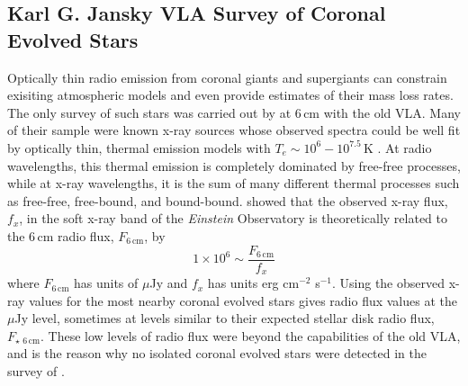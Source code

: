 
\subsection{Karl G. Jansky VLA Survey of Coronal Evolved Stars}\label{sec:8.2.4}
Optically thin radio emission from coronal giants and supergiants can constrain exisiting atmospheric models and even provide estimates of their mass loss rates. The only survey of such stars was carried out by \cite{drake_1986} at 6\,cm with the old VLA. Many of their sample were known x-ray sources whose observed spectra could be well fit by optically thin, thermal emission models with $T_e \sim 10^6-10^{7.5}$\,K \citep{ayres_1981}. At radio wavelengths, this thermal emission is completely dominated by free-free processes, while at x-ray wavelengths, it is the sum of many different thermal processes such as free-free, free-bound, and bound-bound. \cite{drake_1986} showed that the observed x-ray flux, $f_{x}$, in the soft x-ray band of the \textit{Einstein} Observatory is theoretically related to the 6\,cm radio flux, $F_{6\,\mathrm{cm}}$, by
\begin{equation}\label{eq:8.1}
1\times 10^6 \sim \frac{F_{6\,\mathrm{cm}}}{f_x}
\end{equation}
where $F_{6\,\mathrm{cm}}$ has units of $\mu$Jy and $f_x$ has units erg cm$^{-2}$ s$^{-1}$. Using the observed x-ray values for the most nearby coronal evolved stars gives radio flux values at the $\mu$Jy level, sometimes at levels similar to their expected stellar disk radio flux, $F_{\star \,\,6\,\mathrm{cm}}$. These low levels of radio flux were  beyond the capabilities of the old VLA, and is the reason why no isolated coronal evolved stars were detected in the survey of \cite{drake_1986}.

